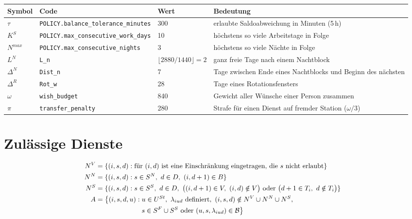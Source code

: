 \documentclass[11pt]{combiArticle}
\newcommand{\code}[1]{\texttt{#1}}
\begin{document}
\begin{center}
\small
\begin{tabular}{l l l >{\raggedright\arraybackslash}p{5.2cm}}
\hline
Symbol & Code & Wert & Bedeutung \\
\hline
$\tau$ & \code{POLICY.balance\_tolerance\_minutes} & 300 & erlaubte Saldoabweichung in Minuten (5\,h) \\
$K^{S}$ & \code{POLICY.max\_consecutive\_work\_days} & 10 & höchstens so viele Arbeitstage in Folge \\
$N^{max}$ & \code{POLICY.max\_consecutive\_nights} & 3 & höchstens so viele Nächte in Folge \\
$L^{N}$ & \code{L\_n} & $\lfloor 2880/1440 \rfloor = 2$ & ganz freie Tage nach einem Nachtblock \\
$\Delta^{N}$ & \code{Dist\_n} & 7 & Tage zwischen Ende eines Nachtblocks und Beginn des nächsten \\
$\Delta^{R}$ & \code{Rot\_w} & 28 & Tage eines Rotationsfensters \\
$\omega$ & \code{wish\_budget} & 840 & Gewicht aller Wünsche einer Person zusammen \\
$\pi$ & \code{transfer\_penalty} & 280 & Strafe für einen Dienst auf fremder Station ($\omega/3$) \\
\hline
\end{tabular}
\end{center}

\section{Zulässige Dienste}

\begin{align}
  N^{V} &= \{(i,s,d) : \text{für } (i,d) \text{ ist eine Einschränkung eingetragen, die } s \text{ nicht erlaubt}\} \label{eq:NV}\\
  N^{N} &= \{(i,s,d) : s \in S^{N},\ d \in D,\ (i,d+1) \in B\} \label{eq:NN}\\
  N^{S} &= \{(i,s,d) : s \in S^{S},\ d \in D,\ \bigl((i,d+1) \in V,\ (i,d) \notin V\bigr) \text{ oder }
          \bigl(d+1 \in T_i,\ d \notin T_i\bigr)\} \label{eq:NS}\\
  A &= \bigl\{(i,s,d,u) : u \in U^{St},\ \lambda_{iud} \text{ definiert},\
       (i,s,d) \notin N^{V} \cup N^{N} \cup N^{S}, \label{eq:A}\\
    &\hphantom{{}= \bigl\{(i,s,d,u) :{}} s \in S^{F} \cup S^{S} \text{ oder } (u,s,\lambda_{iud}) \in \mathcal{B}\bigr\} \notag
\end{align}
\end{document}
